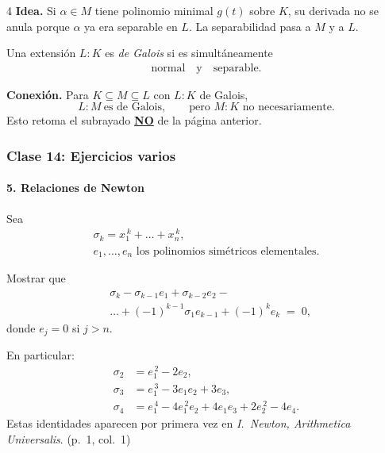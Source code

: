 \documentclass[landscape,a4paper]{article}
\begin{document}
\begin{multicols}{4}
\noindent\textbf{Idea.}  
Si $\alpha\in M$ tiene polinomio minimal $g(t)$ sobre $K$, su derivada no se anula porque $\alpha$ ya era separable en $L$.  La separabilidad pasa a $M$ y a $L$.

\vspace{1em}
\begin{tcolorbox}[colback=white,colframe=blue!80!black,
                  colbacktitle=blue!80!black,coltitle=white,
                  title={Definición: Extensión de Galois (p.~7, col.~4)}]
Una extensión $L:K$ es \emph{de Galois} si es simultáneamente\\
\begin{align}
\text{normal} \quad\text{y}\quad \text{separable}. \tag*{(p.~7, col.~4)}
\end{align}
\end{tcolorbox}

\noindent\textbf{Conexión.}\; Para $K\subseteq M\subseteq L$ con $L:K$ de Galois,
\[
L:M\ \text{es de Galois}, 
\qquad
\boxed{\text{pero }M:K\text{ no necesariamente.}}
\]
Esto retoma el subrayado \underline{\textbf{NO}} de la página anterior.
\subsubsection*{Clase 14: Ejercicios varios}

\paragraph{5. Relaciones de Newton} Sea 
\begin{align*}
  \sigma_k = x_1^{\,k} + \dots + x_n^{\,k}, 
\qquad\\
e_1,\dots,e_n \text{ los polinomios simétricos elementales}.
\end{align*}

Mostrar que
\begin{align}
& \sigma_k - \sigma_{k-1}e_1 + \sigma_{k-2}e_2 - \\ &\dots 
       + (-1)^{k-1}\sigma_1 e_{k-1} + (-1)^{k} e_k \;=\; 0,
\tag*{(p.~1, col.~1)}
\end{align}
donde $e_j = 0$ si $j>n$.  

En particular:
\begin{align}
\sigma_2 &= e_1^{\,2} - 2e_2,\\
\sigma_3 &= e_1^{\,3} - 3e_1e_2 + 3e_3,\\
\sigma_4 &= e_1^{\,4} - 4e_1^{\,2}e_2 + 4e_1e_3 + 2e_2^{\,2} - 4e_4.
\end{align}
Estas identidades aparecen por primera vez en \emph{I.~Newton, Arithmetica Universalis}. (p.~1, col.~1)



\end{multicols}
\end{document}
